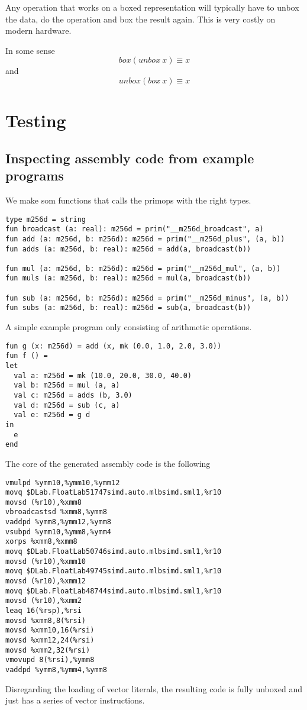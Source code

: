 \documentclass{article}
\begin{document}
Any operation that works on a boxed representation will typically have to unbox the data, do the operation and box the result again. This is very costly on modern hardware.

In some sense
\[
    box (unbox\ x) \equiv x
\]
and
\[
    unbox (box\ x) \equiv x
\]

\section{Testing}

\subsection{Inspecting assembly code from example programs}

We make som functions that calls the primops with the right types.
\begin{lstlisting}
type m256d = string
fun broadcast (a: real): m256d = prim("__m256d_broadcast", a)
fun add (a: m256d, b: m256d): m256d = prim("__m256d_plus", (a, b))
fun adds (a: m256d, b: real): m256d = add(a, broadcast(b))

fun mul (a: m256d, b: m256d): m256d = prim("__m256d_mul", (a, b))
fun muls (a: m256d, b: real): m256d = mul(a, broadcast(b))

fun sub (a: m256d, b: m256d): m256d = prim("__m256d_minus", (a, b))
fun subs (a: m256d, b: real): m256d = sub(a, broadcast(b))
\end{lstlisting}
A simple example program only consisting of arithmetic operations.
\begin{lstlisting}
fun g (x: m256d) = add (x, mk (0.0, 1.0, 2.0, 3.0))
fun f () =
let
  val a: m256d = mk (10.0, 20.0, 30.0, 40.0)
  val b: m256d = mul (a, a)
  val c: m256d = adds (b, 3.0)
  val d: m256d = sub (c, a)
  val e: m256d = g d
in 
  e
end
\end{lstlisting}
The core of the generated assembly code is the following
\begin{verbatim}
vmulpd %ymm10,%ymm10,%ymm12
movq $DLab.FloatLab51747simd.auto.mlbsimd.sml1,%r10
movsd (%r10),%xmm8
vbroadcastsd %xmm8,%ymm8
vaddpd %ymm8,%ymm12,%ymm8
vsubpd %ymm10,%ymm8,%ymm4
xorps %xmm8,%xmm8
movq $DLab.FloatLab50746simd.auto.mlbsimd.sml1,%r10
movsd (%r10),%xmm10
movq $DLab.FloatLab49745simd.auto.mlbsimd.sml1,%r10
movsd (%r10),%xmm12
movq $DLab.FloatLab48744simd.auto.mlbsimd.sml1,%r10
movsd (%r10),%xmm2
leaq 16(%rsp),%rsi
movsd %xmm8,8(%rsi)
movsd %xmm10,16(%rsi)
movsd %xmm12,24(%rsi)
movsd %xmm2,32(%rsi)
vmovupd 8(%rsi),%ymm8
vaddpd %ymm8,%ymm4,%ymm8
\end{verbatim}
Disregarding the loading of vector literals, the resulting code is fully unboxed and just has a series of vector instructions.
\end{document}
